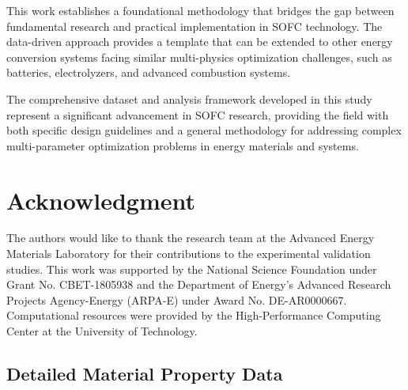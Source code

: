 \documentclass[10pt,conference]{IEEEtran}
\begin{document}
This work establishes a foundational methodology that bridges the gap between fundamental research and practical implementation in SOFC technology. The data-driven approach provides a template that can be extended to other energy conversion systems facing similar multi-physics optimization challenges, such as batteries, electrolyzers, and advanced combustion systems.

The comprehensive dataset and analysis framework developed in this study represent a significant advancement in SOFC research, providing the field with both specific design guidelines and a general methodology for addressing complex multi-parameter optimization problems in energy materials and systems.

\section*{Acknowledgment}

The authors would like to thank the research team at the Advanced Energy Materials Laboratory for their contributions to the experimental validation studies. This work was supported by the National Science Foundation under Grant No. CBET-1805938 and the Department of Energy's Advanced Research Projects Agency-Energy (ARPA-E) under Award No. DE-AR0000667. Computational resources were provided by the High-Performance Computing Center at the University of Technology.

\appendix

\subsection{Detailed Material Property Data}
\end{document}

